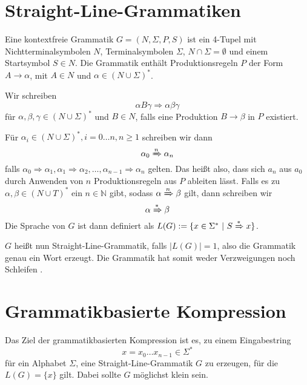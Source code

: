 \section{Straight-Line-Grammatiken}

Eine kontextfreie Grammatik $G = (N, \Sigma, P, S)$ ist ein 4-Tupel mit Nichtterminalsymbolen $N$, Terminalsymbolen $\Sigma$, $N \cap \Sigma = \emptyset$ und einem Startsymbol $S \in N$.
Die Grammatik enthält Produktionsregeln $P$ der Form $A \rightarrow \alpha$, mit $A \in N$ und $\alpha \in (N \cup \Sigma)^*$.

Wir schreiben 
\begin{equation*}
	\alpha B \gamma \Rightarrow \alpha \beta \gamma
\end{equation*}
für $\alpha, \beta, \gamma \in (N \cup \Sigma)^*$ und $B \in N$, falls eine Produktion $B \rightarrow \beta$ in $P$ existiert. 

Für $\alpha_i \in (N \cup \Sigma)^*, i = 0 \dots n, n \geq 1$ schreiben wir dann 
\begin{equation*}
	\alpha_0 \xRightarrow{n} \alpha_n
\end{equation*}
falls $\alpha_0 \Rightarrow \alpha_1, \alpha_1 \Rightarrow \alpha_2, \dots, \alpha_{n-1} \Rightarrow \alpha_n$ gelten. Das heißt also, dass sich $a_n$ aus $a_0$ durch Anwenden von $n$ Produktionsregeln aus $P$ ableiten lässt.
Falls es zu $\alpha, \beta \in (N \cup T)^*$ ein $n \in \mathbb{N}$ gibt, sodass $\alpha \xRightarrow{n} \beta$ gilt, dann schreiben wir 
\begin{equation*}
	\alpha \xRightarrow{*} \beta
\end{equation*}
Die Sprache von $G$ ist dann definiert als $L(G) := \{x \in \Sigma^*\ |\ S \xRightarrow{*} x\}$.

$G$ heißt nun Straight-Line-Grammatik, falls $|L(G)| = 1$, also die Grammatik genau ein Wort erzeugt. Die Grammatik hat somit weder Verzweigungen noch Schleifen \cite{benz_effective_2013}. 

\section{Grammatikbasierte Kompression}

Das Ziel der grammatikbasierten Kompression ist es, zu einem Eingabestring 
\begin{equation*}
	x = x_0 \dots x_{n-1} \in \Sigma^*
\end{equation*}
für ein Alphabet $\Sigma$, eine Straight-Line-Grammatik $G$ zu erzeugen, für die $L(G) = \{x\}$ gilt. Dabei sollte $G$ möglichst klein sein. 

